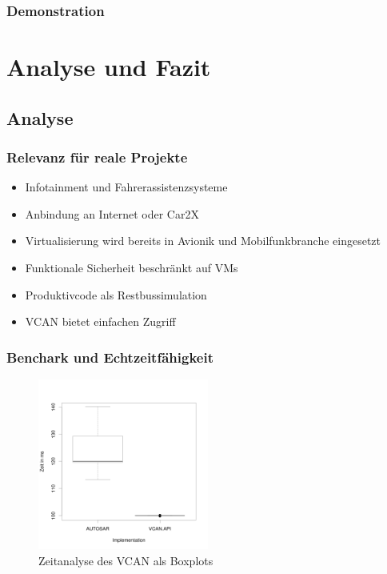 \documentclass[]{beamer}
\begin{document}
\begin{frame}
\frametitle{Demonstration}

\end{frame}





\section{Analyse und Fazit}
\label{sec:analyse_fazit}

\subsection{Analyse}
\begin{frame}
\frametitle{Relevanz für reale Projekte}
    \begin{itemize}
        \item Infotainment und Fahrerassistenzsysteme
        \item Anbindung an Internet oder Car2X
        \item Virtualisierung wird bereits in Avionik und Mobilfunkbranche eingesetzt
        \item Funktionale Sicherheit beschränkt auf VMs
        \item Produktivcode als Restbussimulation
        \item VCAN bietet einfachen Zugriff
    \end{itemize}
\end{frame}

\begin{frame}
\frametitle{Benchark und Echtzeitfähigkeit}
    \begin{figure}
        \centering
        \includegraphics[width=0.5\textwidth]{boxplot}
        \caption[Zeitanalyse des VCAN als Boxplots]{Zeitanalyse des VCAN als Boxplots}
        \label{fig:timinganalyse}
    \end{figure}
\end{frame}
\end{document}
